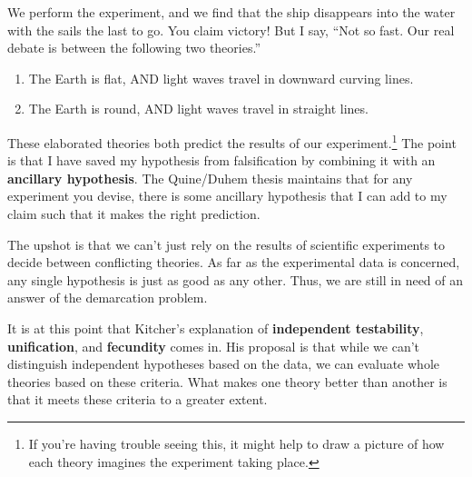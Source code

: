 \documentclass[10pt]{article}
\begin{document}
We perform the experiment, and we find that the ship disappears into the water with the sails the last to go.  You claim victory! But I say, ``Not so fast.  Our real debate is between the following two theories.''

\begin{enumerate}[(T1)]
 \item The Earth is flat, AND light waves travel in downward curving lines.
 \item The Earth is round, AND light waves travel in straight lines.
\end{enumerate}

These elaborated theories both predict the results of our experiment.\footnote{If you're having trouble seeing this, it might help to draw a picture of how each theory imagines the experiment taking place.} The point is that I have saved my hypothesis from falsification by combining it with an \textbf{ancillary hypothesis}. The Quine/Duhem thesis maintains that for any experiment you devise, there is some ancillary hypothesis that I can add to my claim such that it makes the right prediction.

The upshot is that we can't just rely on the results of scientific experiments to decide between conflicting theories.  As far as the experimental data is concerned, any single hypothesis is just as good as any other. Thus, we are still in need of an answer of the demarcation problem.

It is at this point that Kitcher's explanation of \textbf{independent testability}, \textbf{unification}, and \textbf{fecundity} comes in.  His proposal is that while we can't distinguish independent hypotheses based on the data, we can evaluate whole theories based on these criteria.  What makes one theory better than another is that it meets these criteria to a greater extent.
\end{document}
